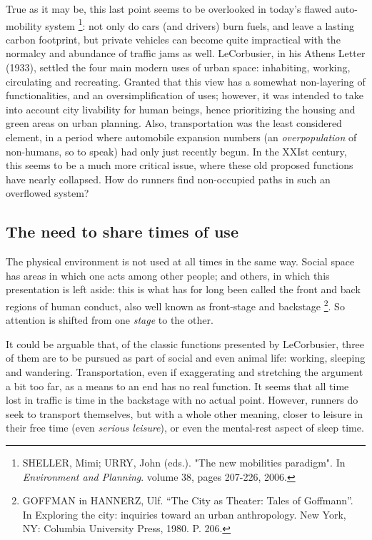 True as it may be, this last point seems to be overlooked in today's flawed auto-mobility system%
\footnote{SHELLER, Mimi; URRY, John (eds.). "The new mobilities paradigm". In \textit{Environment and Planning}. volume 38, pages 207-226, 2006.
}:
not only do cars (and drivers) burn fuels, and leave a lasting carbon footprint, but  private vehicles can become  quite impractical with the normalcy and abundance of traffic jams as well. LeCorbusier, in his Athens Letter (1933), settled the four main modern uses of urban space: inhabiting, working, circulating and recreating. Granted that this view has a somewhat non-layering of
functionalities, and an oversimplification of uses; however, it was intended to take into account city livability for human beings, hence prioritizing the housing and green areas on urban planning. Also, transportation was the least considered element, in a period where automobile expansion numbers (an \textit{overpopulation} of non-humans, so to speak) had only just recently begun. In the XXIst  century, this seems to be a much more critical issue, where these old proposed functions have %
nearly collapsed. How do runners find non-occupied paths in such an overflowed system?

\subsection*{The need to share times of use}

The physical environment is not used at all times in the same way. Social space has areas in which one acts among other people; and others, in which this presentation is left aside: this is what has for long been called the front and back regions of human conduct, also well known as front-stage and backstage%
\footnote{GOFFMAN in HANNERZ, Ulf. “The City as Theater: Tales of Goffmann”. In Exploring the city: inquiries toward an urban anthropology. New York, NY: Columbia University Press, 1980. P. 206.}.
So attention is shifted from one \textit{stage} %
to the other. 

It could be arguable that, of the classic functions presented by LeCorbusier, three of them are to be pursued as part of social and even animal life: working, sleeping and wandering. Transportation, even if exaggerating and stretching the argument a bit too far, as a means to an end has no real function. It seems that all time lost in traffic is time in the backstage with no actual point. However, runners do seek to transport themselves, but with a whole other meaning, closer to leisure in their free time (even \textit{serious leisure}), or even the mental-rest aspect of sleep time.
